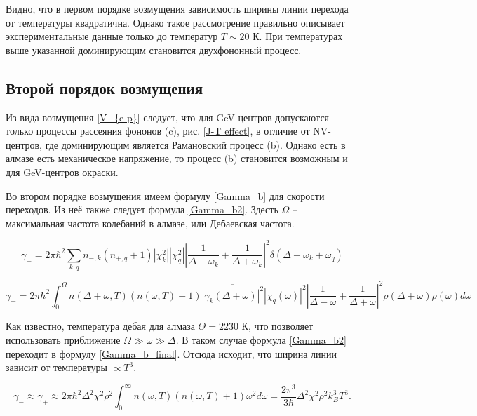 Видно, что в первом порядке возмущения зависимость ширины линии перехода от температуры
квадратична. Однако такое рассмотрение правильно описывает экспериментальные данные
только до температур $T \sim 20 \text{ К}$. При температурах выше указанной доминирующим
становится двухфононный процесс.

\subsection{Второй порядок возмущения}
Из вида возмущения \ref{V_{e-p}} следует, что для GeV-центров допускаются только
процессы рассеяния фононов (c), рис. \ref{J-T effect}, в отличие от NV-центров, где
доминирующим является Рамановский процесс (b). Однако есть в алмазе есть механическое
напряжение, то процесс (b) становится возможным и для GeV-центров окраски. 

Во втором порядке возмущения имеем формулу \ref{Gamma_b} для скорости переходов.
Из неё также следует формула \ref{Gamma_b2}. Здесть $\Omega$ -- максимальная
частота колебаний в алмазе, или Дебаевская частота.

\begin{equation}
    \label{Gamma_b}
    \gamma_{-} = 2\pi \hbar^2 \sum_{k, q}n_{-, k}\left(n_{+, q} + 1 \right) 
    |\chi_k^2||\chi_q^2|\left|\frac{1}{\Delta - \omega_k} + \frac{1}{\Delta + \omega_k
    } \right|^2 \delta\left(\Delta - \omega_k + \omega_q \right)
\end{equation}

\begin{equation}
    \label{Gamma_b2}
    \gamma_{-} = 2 \pi \hbar^2 \int_{0}^{\Omega} n\left(\Delta + \omega, T\right)
    \left(n\left(\omega, T \right) + 1\right) \overline{\left|\gamma_k \left(
        \Delta + \omega
    \right)\right|^2}\overline{\left|\chi_q\left(\omega\right)\right|^2}\left|
    \frac{1}{\Delta - \omega} + \frac{1}{\Delta + \omega}\right|^2\rho\left(\Delta + \omega
    \right)\rho\left(\omega\right)d\omega
\end{equation}


Как известно, температура дебая для алмаза $\Theta = 2230 \text{ К}$, что позволяет
использовать приближение $\Omega \gg \omega \gg \Delta$. В таком случае формула
\ref{Gamma_b2} переходит в формулу \ref{Gamma_b_final}. Отсюда исходит, что ширина
линии зависит от температуры $\propto T^3$. 

\begin{equation}
    \label{Gamma_b_final}
    \gamma_{-} \approx \gamma_{+} \approx 2 \pi \hbar^2 \Delta^2 \chi^2 \rho^2
    \int_{0}^{\infty} n\left(\omega, T\right)\left(n\left(\omega, T\right)+1\right)
    \omega^2 d\omega = \frac{2 \pi^3}{3\hbar}\Delta^2 \chi^2 \rho^2 k_{B}^3 T^3.
\end{equation}


